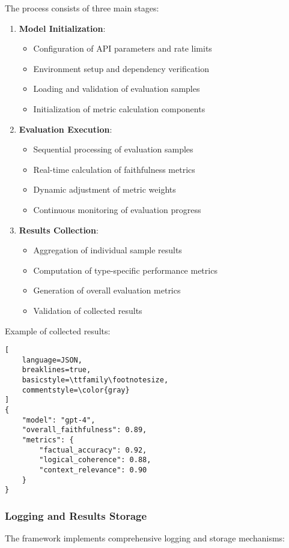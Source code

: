 \vspace{0.5em}
The process consists of three main stages:
\begin{enumerate}
    \item \textbf{Model Initialization}:
    \begin{itemize}
        \item Configuration of API parameters and rate limits
        \item Environment setup and dependency verification
        \item Loading and validation of evaluation samples
        \item Initialization of metric calculation components
    \end{itemize}

    \item \textbf{Evaluation Execution}:
    \begin{itemize}
        \item Sequential processing of evaluation samples
        \item Real-time calculation of faithfulness metrics
        \item Dynamic adjustment of metric weights
        \item Continuous monitoring of evaluation progress
    \end{itemize}

    \item \textbf{Results Collection}:
    \begin{itemize}
        \item Aggregation of individual sample results
        \item Computation of type-specific performance metrics
        \item Generation of overall evaluation metrics
        \item Validation of collected results
    \end{itemize}
\end{enumerate}

Example of collected results:
\begin{lstlisting}[
    language=JSON,
    breaklines=true,
    basicstyle=\ttfamily\footnotesize,
    commentstyle=\color{gray}
]
{
    "model": "gpt-4",
    "overall_faithfulness": 0.89,
    "metrics": {
        "factual_accuracy": 0.92,
        "logical_coherence": 0.88,
        "context_relevance": 0.90
    }
}
\end{lstlisting}

\subsubsection{Logging and Results Storage}
The framework implements comprehensive logging and storage mechanisms:

